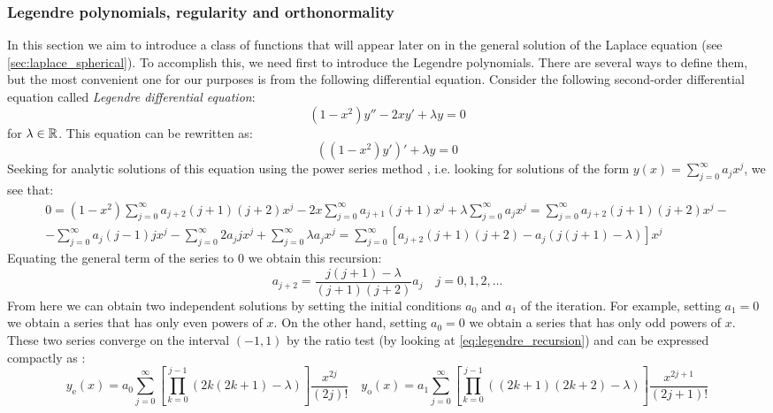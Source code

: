 \documentclass[../main.tex]{subfiles}
\begin{document}
\subsubsection{Legendre polynomials, regularity and orthonormality}
In this section we aim to introduce a class of functions that will appear later on in the general solution of the Laplace equation (see \cref{sec:laplace_spherical}). To accomplish this, we need first to introduce the Legendre polynomials. There are several ways to define them, but the most convenient one for our purposes is from the following differential equation. Consider the following second-order differential equation called \emph{Legendre differential equation}:
\begin{equation}
  (1-x^2)y''-2xy'+\lambda y=0
\end{equation}
for $\lambda\in\mathbb{R}$. This equation can be rewritten as:
\begin{equation}\label{eq:legendre_diff_eq}
  {((1-x^2)y')}'+\lambda  y=0
\end{equation}
Seeking for analytic solutions of this equation using the power series method \cite{florida:legendre}, i.e. looking for solutions of the form $y(x)=\sum_{j=0}^{\infty}a_jx^j$, we see that:
\begin{multline}
  0=(1-x^2)\sum_{j=0}^{\infty}a_{j+2}(j+1)(j+2)x^j-2x\sum_{j=0}^{\infty}a_{j+1}(j+1)x^j+\lambda\sum_{j=0}^{\infty}a_jx^j =\sum_{j=0}^{\infty}a_{j+2}(j+1)(j+2)x^j-\\-\sum_{j=0}^{\infty}a_{j}(j-1)jx^{j}-\sum_{j=0}^{\infty}2a_{j}jx^{j}+\sum_{j=0}^{\infty}\lambda a_jx^j  =\sum_{j=0}^{\infty}[a_{j+2}(j+1)(j+2) - a_j(j(j+1)-\lambda)]x^j
\end{multline}
Equating the general term of the series to 0 we obtain this recursion:
\begin{equation}\label{eq:legendre_recursion}
  a_{j+2}=\frac{j(j+1)-\lambda}{(j+1)(j+2)}a_j\quad j=0,1,2,\ldots
\end{equation}
From here we can obtain two independent solutions by setting the initial conditions $a_0$ and $a_1$ of the iteration. For example, setting $a_1=0$ we obtain a series that has only even powers of $x$. On the other hand, setting $a_0=0$ we obtain a series that has only odd powers of $x$. These two series converge on the interval $(-1,1)$ by the ratio test (by looking at \cref{eq:legendre_recursion}) and can be expressed compactly as \cite{florida:legendre}:
\begin{equation}\label{eq:legendre_series}
  y_\mathrm{e}(x)=a_0\sum_{j=0}^{\infty}\left[\prod_{k=0}^{j-1}(2k(2k+1)-\lambda)\right]\frac{x^{2j}}{(2j)!}\quad y_\mathrm{o}(x)=a_1\sum_{j=0}^{\infty}\left[\prod_{k=0}^{j-1}((2k+1)(2k+2)-\lambda)\right]\frac{x^{2j+1}}{(2j+1)!}
\end{equation}
\end{document}
